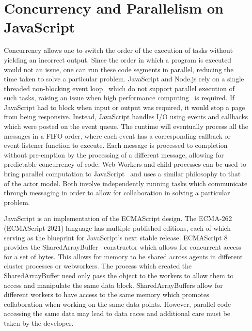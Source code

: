 \documentclass[12pt, a4paper]{report}
\theoremstyle{definition}
\theoremstyle{definition}%
\theoremstyle{definition}%
\theoremstyle{definition}%
\theoremstyle{definition}%
\theoremstyle{definition}%
\begin{document}
\section{Concurrency and Parallelism on JavaScript}
Concurrency allows one to switch the order of the execution of tasks without yielding an incorrect output. Since the order in which a program is executed would not an issue, one can run these code segments in parallel, reducing the time taken to solve a particular problem. JavaScript and Node.js rely on a single threaded non-blocking event loop~\cite{eventloopbrowser}\cite{eventloopnode} which do not support parallel execution of such tasks, raising an issue when high performance computing~\cite{highperformance} is required. If JavaScript had to block when input or output was required, it would stop a page from being responsive. Instead, JavaScript handles I/O using events and callbacks which were posted on the event queue. The runtime will eventually process all the messages in a FIFO order, where each event has a corresponding callback or event listener function to execute. Each message is processed to completion without pre-emption by the processing of a different message, allowing for predictable concurrency of code. Web Workers\cite{webworkers} and child processes\cite{cluster} can be used to bring parallel computation to JavaScript~\cite{concurrencyjs}\cite{spidersjs} and uses a similar philosophy to that of the actor model. Both involve independently running tasks which communicate through messaging in order to allow for collaboration in solving a particular problem.

JavaScript is an implementation of the ECMAScript design. The ECMA-262 (ECMAScript 2021) language has multiple published editions, each of which serving as the blueprint for JavaScript’s next stable release. ECMAScript 8~\cite{ecmascript} provides the SharedArrayBuffer~\cite{sharedarraybuffer} constructor which allows for concurrent access for a set of bytes. This allows for memory to be shared across agents in different cluster processes or webworkers. The process which created the SharedArrayBuffer need only pass the object to the workers to allow them to access and manipulate the same data block. SharedArrayBuffers allow for different workers to have access to the same memory which promotes collaboration when working on the same data points. However, parallel code accessing the same data may lead to data races and additional care must be taken by the developer.
\end{document}
